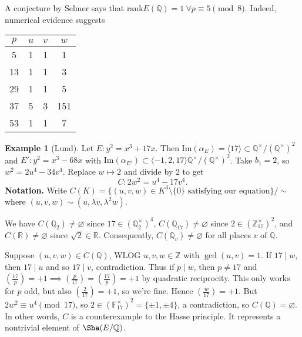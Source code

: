 \documentclass{article}
\theoremstyle{definition}
\newtheorem{example}{Example}[section]
\begin{document}
A conjecture by Selmer says that $\text{rank}E(\mathbb{Q})=1~\forall p \equiv 5 \pmod{8}$. Indeed, numerical evidence suggests  
\begin{center}
    \begin{tabular}{ c|ccc } 
        $p$ & $u$ & $v$ & $w$ \\
        \hline
        5&1&1&1\\
        13 & 1&1&3 \\ 
        29 & 1&1&5 \\ 
        37&5&3&151\\
        53&1&1&7
    \end{tabular}
\end{center}
\begin{example}[Lund]
    Let $E:y^2=x^3+17x$. Then $\text{Im}(\alpha_E) = \langle 17 \rangle \subset \mathbb{Q}^\times/(\mathbb{Q}^\times)^2$ and $E' : y^2=x^3-68x$ with $\text{Im}(\alpha_{E'}) \subset  \langle -1,2,17 \rangle \mathbb{Q}^\times/(\mathbb{Q}^\times)^2$. Take $b_1=2$, so $w^2 =2u^4-34v^4$. Replace $w \mapsto 2$ and divide by 2 to get \[
    C: 2w^2 = u^4-17v^4.
    \]
    \textbf{Notation.} Write $C(K) = \{(u,v,w) \in K^3\setminus \{0\} \text{ satisfying our equation}\}/\sim$ where $(u,v,w)\sim(u,\lambda v, \lambda^2 w)$.
    \vspace{1mm}
     
    We have $C(\mathbb{Q}_2) \neq \varnothing$ since $17 \in (\mathbb{Q}_2^\times)^4$, $C(\mathbb{Q}_{17}) \neq \varnothing$ since $2 \in (\mathbb{Z}_{17}^\times)^2$, and $C(\mathbb{R}) \neq \varnothing$ since $\sqrt{2} \in \mathbb{R}$. Consequently, $C(\mathbb{Q}_v) \neq \varnothing$ for all places $v$ of $\mathbb{Q}$.
    \vspace{1mm}
     
    Suppose $(u,v,w) \in C(\mathbb{Q})$, WLOG $u,v,w \in \mathbb{Z}$ with $\gcd(u,v)=1$. If $17 \mid w$, then $17 \mid  u$ and so $17 \mid v$, contradiction. Thus if $p \mid w$, then $p \neq 17$ and $\left( \frac{17}{p} \right) = +1 \implies \left( \frac{p}{17} \right) = \left( \frac{17}{p} \right) = +1$ by quadratic reciprocity. This only works for $p$ odd, but also $\left( \frac{2}{17} \right) =+1$, so we're fine. Hence $\left( \frac{w}{17} \right) =+1$. But $2w^2 \equiv u^4 \pmod{17}$, so $2 \in (\mathbb{F}_{17}^\times)^2 = \{\pm 1, \pm 4\}$, a contradiction, so $C(\mathbb{Q}) = \varnothing$. In other words, $C$ is a counterexample to the Hasse principle. It represents a nontrivial element of $\Sha(E/\mathbb{Q})$.
\end{example}
\end{document}
